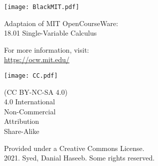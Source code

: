 \documentclass[../main]{subfiles}
\begin{document}
\thispagestyle{empty}

\vspace*{\fill}

\small
\texttt{[image: BlackMIT.pdf]}

Adaptaion of MIT OpenCourseWare:\\
18.01 Single-Variable Calculus

For more information, visit:\\
{\color{MITblue} \url{https://ocw.mit.edu/}}

\vspace*{2em}

\texttt{[image: CC.pdf]}

(CC BY-NC-SA 4.0)\\
4.0 International\\
Non-Commercial\\
Attribution\\
Share-Alike

\vspace*{2em}

Provided under a Creative Commons License.\\
2021. Syed, Danial Haseeb. Some rights reserved.
\end{document}

